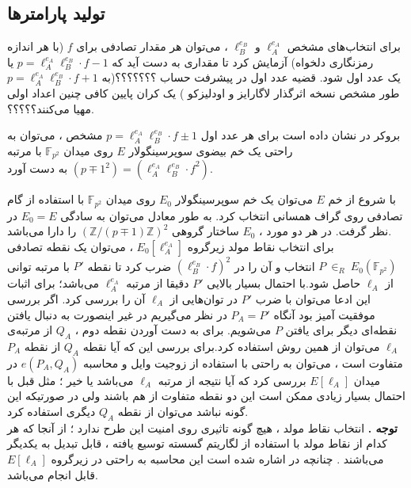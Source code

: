 \documentclass[12pt,a4paper]{article}
\begin{document}
\subsection{\bf تولید پارامترها}\label{parameter_generate}

برای انتخاب‌های مشخص
$\ell_A^{e_A}$
و
$\ell_B^{e_B}$
، می‌توان هر مقدار تصادفی برای
$f$
(با هر اندازه رمزنگاری دلخواه) آزمایش کرد تا مقداری به دست آید که
$p = \ell_A^{e_A} \ell_B^{e_B} \cdot f - 1$
 یا  \\
$p = \ell_A^{e_A} \ell_B^{e_B} \cdot f + 1$
یک عدد اول شود. قضیه عدد اول در پیشرفت حساب ؟؟؟؟؟؟؟(به طور مشخص نسخه اثرگذار لاگارایز و اودلیزکو 
\cite{lagarias}
) یک کران پایین کافی چنین اعداد اولی مهیا می‌کنند؟؟؟؟؟.

بروکر در
\cite{broker}
نشان داده است برای هر عدد اول 
$p = \ell_A^{e_A} \ell_B^{e_B} \cdot f \pm 1$
مشخص ، می‌توان به راحتی یک خم بیضوی سوپرسینگولار 
$E$
روی میدان
$\mathbb{F}_{p^2}$
با مرتبه 
$({p \mp 1}^2) = ({\ell_A^{e_A} \ell_B^{e_B} \cdot f}^2)$
به دست آورد.

با شروع از خم
$E$
می‌توان یک خم سوپرسینگولار 
$E_0$
روی میدان
$\mathbb{F}_{p^2}$
با استفاده از گام تصادفی روی گراف همسانی انتخاب کرد. به طور معادل می‌توان به سادگی 
$E_0 = E$
در نظر گرفت. در هر دو مورد ، 
$E_0$
ساختار گروهی
${(\mathbb{Z} / (p \mp 1)\mathbb{Z})}^2$
را دارا می‌باشد.\\
برای انتخاب نقاط مولد زیرگروه
$E_0[\ell_A^{e_A}]$
، می‌توان یک نقطه تصادفی 
$P \:  {\in}_R \: E_0(\mathbb{F}_{p^2}) $
انتخاب و آن را در 
${(\ell_B^{e_B} \cdot f )}^2$
ضرب کرد تا نقطه
$P'$
 با مرتبه توانی از 
$\ell_A$
 حاصل شود.با احتمال بسیار بالایی 
 $P'$
 دقیقا از مرتبه
 $\ell_A^{e_A}$
 می‌باشد؛ برای اثبات این ادعا می‌توان با ضرب 
$P'$
در توان‌هایی از 
 $\ell_A$
 آن را بررسی کرد. اگر بررسی موفقیت آمیز بود آنگاه 
 $P_A = P'$
 در نظر می‌گیریم در غیر اینصورت به دنبال یافتن نقطه‌ای دیگر برای یافتن
 $P$
 می‌شویم. برای به دست آوردن نقطه دوم ،
 $Q_A$
 از مرتبه‌ی
 $\ell_A$
 می‌توان از همین روش استفاده کرد.برای بررسی این که آیا نقطه
 $Q_A$
 از نقطه
 $P_A$
 متفاوت است ، می‌توان به راحتی با استفاده از زوجیت وایل
  و محاسبه
 $e(P_A,Q_A)$
 در میدان
$E[\ell_A]$
 بررسی کرد که آیا نتیجه از مرتبه 
 $\ell_A$
 می‌باشد یا خیر ؛ مثل قبل با احتمال بسیار زیادی ممکن است این دو نقطه متفاوت از هم باشند ولی در صورتیکه این گونه نباشد می‌توان از نقطه  
   $Q_A$
 دیگری استفاده کرد.\\
 \textbf{توجه .}
 انتخاب نقاط مولد ، هیچ گونه تاثیری روی امنیت این طرح ندارد ؛ از آنجا که هر کدام از نقاط مولد با استفاده از لگاریتم گسسته توسیع یافته 
 ، قابل تبدیل به یکدیگر می‌باشند . چنانچه در 
\cite{teske}
 اشاره شده است این محاسبه به راحتی در زیرگروه
 $E[\ell_A]$
 قابل انجام می‌باشد. 
 
\end{document}
